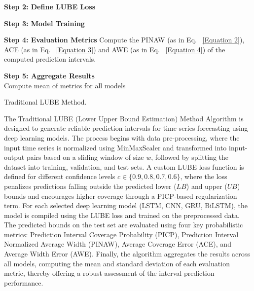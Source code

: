 \begin{itemize}
\begin{algorithm}[H]
        \textbf{Step 2: Define LUBE Loss}\\
        
        \textbf{Step 3: Model Training}
        
        \textbf{Step 4: Evaluation Metrics} Compute the PINAW (as in Eq. ~\eqref{Equation 2}), ACE (as in Eq. ~\eqref{Equation 3}) and AWE (as in Eq. ~\eqref{Equation 4}) of the computed prediction intervals.
        
        \textbf{Step 5: Aggregate Results}\\
        Compute mean of metrics for all models
        
        \caption{Traditional LUBE Method.}
        \end{algorithm}
 
        The Traditional LUBE (Lower Upper Bound Estimation) Method Algorithm is designed to generate reliable prediction intervals for time series forecasting using deep learning models. The process begins with data pre-processing, where the input time series is normalized using MinMaxScaler and transformed into input-output pairs based on a sliding window of size $w$, followed by splitting the dataset into training, validation, and test sets. A custom LUBE loss function is defined for different confidence levels $c \in \{0.9, 0.8, 0.7, 0.6\}$, where the loss penalizes predictions falling outside the predicted lower ($LB$) and upper ($UB$) bounds and encourages higher coverage through a PICP-based regularization term. For each selected deep learning model (LSTM, CNN, GRU, BiLSTM), the model is compiled using the LUBE loss and trained on the preprocessed data. The predicted bounds on the test set are evaluated using four key probabilistic metrics: Prediction Interval Coverage Probability (PICP), Prediction Interval Normalized Average Width (PINAW), Average Coverage Error (ACE), and Average Width Error (AWE). Finally, the algorithm aggregates the results across all models, computing the mean and standard deviation of each evaluation metric, thereby offering a robust assessment of the interval prediction performance.



\end{itemize}
